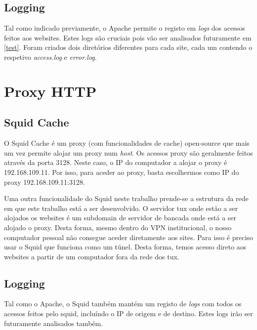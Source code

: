 \subsection{Logging}
Tal como indicado previamente, o Apache permite o registo em \textit{logs} dos acessos feitos aos websites.
Estes logs são cruciais pois vão ser analisados futuramente em \ref{test}. Foram criados dois diretórios diferentes para cada site, 
cada um contendo o respetivo \textit{access.log} e \textit{error.log}. 

\section{Proxy HTTP} \label{proxy}

\subsection{Squid Cache}

O Squid Cache é um proxy (com funcionalidades de cache) open-source que mais um vez permite alojar um proxy num \textit{host}.
Os acessos proxy são geralmente feitos através da porta 3128. Neste caso, o IP do computador a alojar o proxy é 192.168.109.11.
Por isso, para aceder ao proxy, basta escolhermos como IP do proxy 192.168.109.11:3128.

Uma outra funcionalidade do Squid neste trabalho prende-se a estrutura da rede em que este trabalho está a ser desenvolvido.
O servidor tux onde estão a ser alojados os websites é um subdomain de servidor de bancada onde está a ser alojado o proxy.
Desta forma, mesmo dentro do VPN institucional, o nosso computador pessoal não consegue aceder diretamente aos sites.
Para isso é preciso usar o Squid que funciona como um túnel. Desta forma, temos acesso direto aos websites a partir de um computador fora da rede dos tux.


\subsection{Logging}
Tal como o Apache, o Squid também mantém um registo de \textit{logs} com todos os acessos feitos pelo squid, incluíndo o IP de origem e de destino.
Estes logs irão ser futuramente analisados também.
